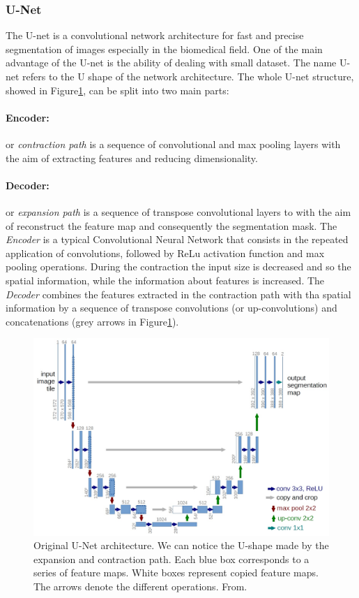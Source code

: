 \documentclass{standalone}
\begin{document}
\subsubsection{U-Net}
The U-net is a convolutional network architecture for fast and precise segmentation of images especially in the biomedical field\cite{unet}.
One of the main advantage of the U-net is the ability of dealing with small dataset. 
The name U-net refers to the U shape of the network architecture. 
The whole U-net structure, showed in Figure\ref{fig:unet}, can be split into two main parts:

\paragraph{Encoder:}
or \textit{contraction path} is a sequence of convolutional and max pooling layers with the aim of extracting features and reducing dimensionality.

\paragraph{Decoder:}
or \textit{expansion path} is a sequence of transpose convolutional layers to with the aim of reconstruct the feature map and consequently the segmentation mask.
The \textit{Encoder} is a typical Convolutional Neural Network that consists in the repeated application of convolutions, followed by ReLu activation function and max pooling operations.
During the contraction the input size is decreased and so the spatial information, while the information about features is increased.
The \textit{Decoder} combines the features extracted in the contraction path  with tha spatial information by a sequence of transpose convolutions (or up-convolutions) and concatenations (grey arrows in Figure\ref{fig:unet}).
\begin{figure}[ht]

    \centering
    \includegraphics[width=.85\textwidth]{../images/U-Net arch.jpeg}
    
    \caption{Original U-Net architecture. We can notice the U-shape made by the expansion and contraction path. Each blue box corresponds to a series of feature maps. White boxes represent copied feature maps. The arrows denote the different operations. From\cite{unet}.}
    \label{fig:unet}
    
    \end{figure}
\end{document}
